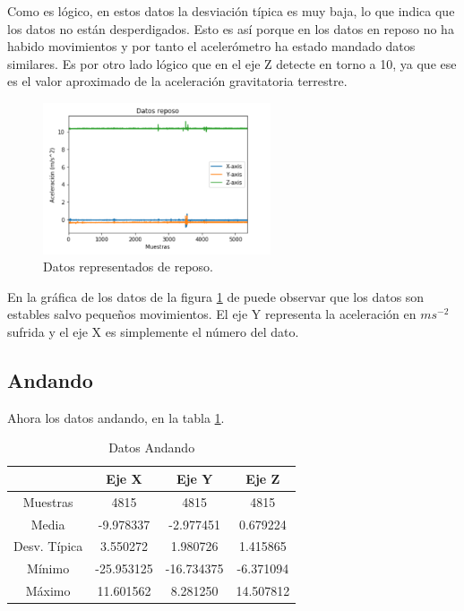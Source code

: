 \documentclass[12pt]{book}
\numberwithin{equation}{section}
\begin{document}
Como es lógico, en estos datos la desviación típica es muy baja, lo que indica que los datos no están desperdigados. Esto es así porque en los datos en reposo no ha habido movimientos y por tanto el acelerómetro ha estado mandado datos similares. Es por otro lado lógico que en el eje Z detecte en torno a 10, ya que ese es el valor aproximado de la aceleración gravitatoria terrestre.

\begin{figure}[h]
    \centering
    \includegraphics[width=0.6\textwidth]{reposodatos.png}
    \caption{Datos representados de reposo.}
    \label{fig:reposodatos}
\end{figure}

En la gráfica de los datos de la figura \ref{fig:reposodatos} de puede observar que los datos son estables salvo pequeños movimientos. El eje Y representa la aceleración en $m s^{-2}$ sufrida y el eje X es simplemente el número del dato.

\subsection{Andando}

Ahora los datos andando, en la tabla \ref{tabla4}.

\begin{table}
\centering
\caption{Datos Andando}
\begin{tabular}{| c | c | c | c |}
\hline
 & Eje X & Eje Y & Eje Z \\
\hline
Muestras & 4815 & 4815 & 4815 \\
\hline
Media & -9.978337 & -2.977451 & 0.679224 \\
\hline
Desv. Típica & 3.550272 & 1.980726 & 1.415865 \\
\hline
Mínimo & -25.953125 & -16.734375 & -6.371094 \\
\hline
Máximo & 11.601562 & 8.281250 & 14.507812 \\
\hline
\end{tabular}
\label{tabla4}
\end{table}
\end{document}
